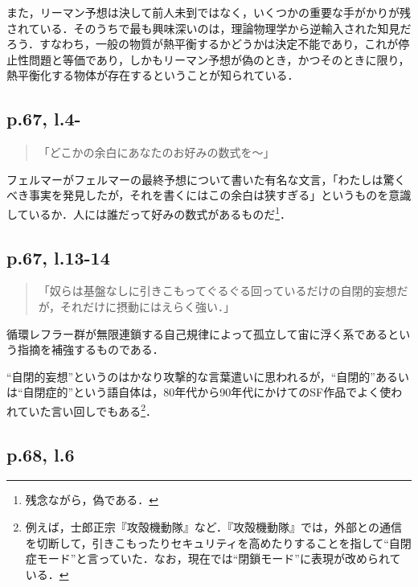 \documentclass[10pt, a5paper, twoside]{jsarticle}
\theoremstyle{definition}
\begin{document}
                また，リーマン予想は決して前人未到ではなく，いくつかの重要な手がかりが残されている．そのうちで最も興味深いのは，理論物理学から逆輸入された知見だろう．すなわち，一般の物質が熱平衡するかどうかは決定不能であり，これが停止性問題と等価であり，しかもリーマン予想が偽のとき，かつそのときに限り，熱平衡化する物体が存在するということが知られている\cite{shi}．

            \subsection{p.67, l.4-}

                \begin{quote}

                    「どこかの余白にあなたのお好みの数式を〜」

                \end{quote}

                フェルマーがフェルマーの最終予想について書いた有名な文言，「わたしは驚くべき事実を発見したが，それを書くにはこの余白は狭すぎる」というものを意識しているか．人には誰だって好みの数式があるものだ\footnote{残念ながら，偽である．}．

            \subsection{p.67, l.13-14}

                \begin{quote}

                    「奴らは基盤なしに引きこもってぐるぐる回っているだけの自閉的妄想だが，それだけに摂動にはえらく強い．」

                \end{quote}

                循環レフラー群が無限連鎖する自己規律によって孤立して宙に浮く系であるという指摘を補強するものである．

                “自閉的妄想”というのはかなり攻撃的な言葉遣いに思われるが，“自閉的”あるいは“自閉症的”という語自体は，80年代から90年代にかけてのSF作品でよく使われていた言い回しでもある\footnote{例えば，士郎正宗『攻殻機動隊』\cite{srms}など．『攻殻機動隊』では，外部との通信を切断して，引きこもったりセキュリティを高めたりすることを指して“自閉症モード”と言っていた．なお，現在では“閉鎖モード”に表現が改められている．}．


            \subsection{p.68, l.6}
\end{document}
